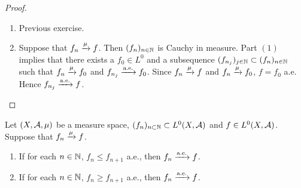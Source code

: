 \documentclass{book}
\begin{document}
	\begin{proof}\
	\begin{enumerate}
		\item Previous exercise.
		\item Suppose that $f_n \xrightarrow{\mu} f$. Then $(f_n)_{n \in \mathbb{N}}$ is Cauchy in measure. Part $(1)$ implies that there exists a $f_0 \in L^0$ and a subsequence $(f_{n_j})_{j \in \mathbb{N}} \subset (f_n)_{n \in \mathbb{N}}$ such that $f_n \xrightarrow{\mu} f_0$ and $f_{n_j} \xrightarrow{\text{a.e.}} f_0$. Since $f_n \xrightarrow{\mu} f$ and $f_n \xrightarrow{\mu} f_0$, $f = f_0$ a.e. Hence $f_{n_j} \xrightarrow{\text{a.e.}} f$.
	\end{enumerate}
	\end{proof}

	\begin{ex}
		Let $(X, \mathcal{A}, \mu)$ be a measure space, $(f_n)_{n \subset \mathbb{N}} \subset L^0(X, \mathcal{A})$ and $f \in  L^0(X, \mathcal{A})$. Suppose that $f_n \xrightarrow{\mu} f$. 
		\begin{enumerate}
			\item If for each $n \in \mathbb{N}$, $f_n \leq f_{n+1}$ a.e., then $f_n \xrightarrow{\text{a.e.}} f$. 
			\item If for each $n \in \mathbb{N}$, $f_n \geq f_{n+1}$ a.e., then $f_n \xrightarrow{\text{a.e.}} f$. 
		\end{enumerate}
	\end{ex}
\end{document}
